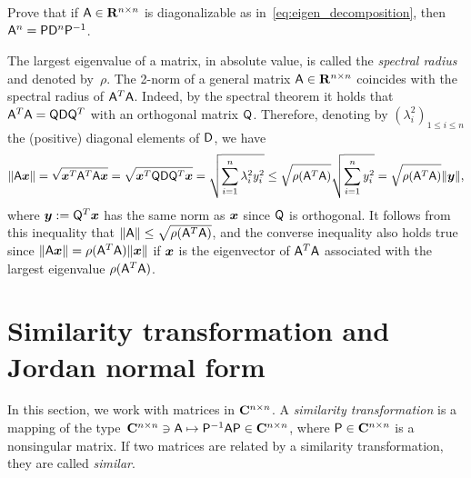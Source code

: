 \begin{exercise}
    Prove that if $\mathsf A \in \mathbf R^{n \times n}$ is diagonalizable as in~\eqref{eq:eigen_decomposition},
    then $\mathsf A^n = \mathsf P \mathsf D^n \mathsf P^{-1}$.
\end{exercise}

The largest eigenvalue of a matrix, in absolute value,
is called the \emph{spectral radius} and denoted by~$\rho$.
The 2-norm of a general matrix $\mathsf A \in \mathbf R^{n \times n}$
coincides with the spectral radius of $\mathsf A^T \mathsf A$.
Indeed, by the spectral theorem it holds that $\mathsf A^T \mathsf A = \mathsf Q \mathsf D \mathsf Q^T$ with an orthogonal matrix $\mathsf Q$.
Therefore, denoting by $(\lambda_i^2)_{1 \leq i \leq n}$ the (positive) diagonal elements of $\mathsf D$,
we have
\begin{equation}
    \label{eq:matrices_link_norm_spectral_radius}
    \lVert\mathsf A \mathbf{\boldsymbol{x}}\rVert
    = \sqrt{\mathbf{\boldsymbol{x}}^T \mathsf A^T \mathsf A \mathbf{\boldsymbol{x}}}
    = \sqrt{\mathbf{\boldsymbol{x}}^T \mathsf Q \mathsf D \mathsf Q^T \mathbf{\boldsymbol{x}}}
    = \sqrt{\sum_{i=1}^{n} \lambda_i^2 y_i^2}
    \leq \sqrt{\rho(\mathsf A^T \mathsf A)} \sqrt{\sum_{i=1}^{n} y_i^2}
    =  \sqrt{\rho(\mathsf A^T \mathsf A)} \lVert\mathbf{\boldsymbol{y}}\rVert,
\end{equation}
where $\mathbf{\boldsymbol{y}} := \mathsf Q^T \mathbf{\boldsymbol{x}}$ has the same norm as $\mathbf{\boldsymbol{x}}$ since $\mathsf Q$ is orthogonal.
It follows from this inequality that $\lVert\mathsf A\rVert \leq \sqrt{\rho(\mathsf A^T \mathsf A)}$,
and the converse inequality also holds true since $\lVert\mathsf A \mathbf{\boldsymbol{x}}\rVert = \rho(\mathsf A^T \mathsf A) \lVert\mathbf{\boldsymbol{x}}\rVert$
if $\mathbf{\boldsymbol{x}}$ is the eigenvector of $\mathsf A^T \mathsf A$ associated with the largest eigenvalue $\rho(\mathsf A^T \mathsf A)$.


\section{Similarity transformation and Jordan normal form}%
\label{sec:similarity_transformation_and_jordan_normal_form}
In this section, we work with matrices in $\mathbf C^{n \times n}$.
A \emph{similarity transformation} is a mapping of the type~$\mathbf C^{n \times n} \ni \mathsf A \mapsto \mathsf P^{-1} \mathsf A \mathsf P \in \mathbf C^{n \times n}$,
where $\mathsf P \in \mathbf C^{n \times n}$ is a nonsingular matrix.
If two matrices are related by a similarity transformation,
they are called \emph{similar}.

